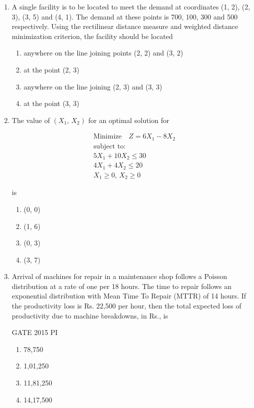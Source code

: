 \documentclass[journal,12pt,onecolumn]{IEEEtran}
\theoremstyle{remark}
\begin{document}
\begin{enumerate}
\item A single facility is to be located to meet the demand at coordinates (1, 2), (2, 3), (3, 5) and (4, 1). The demand at these points is 700, 100, 300 and 500 respectively. Using the rectilinear distance measure and weighted distance minimization criterion, the facility should be located
\begin{multicols}{2}
\begin{enumerate}
    \item anywhere on the line joining points (2, 2) and (3, 2)
    \item at the point (2, 3)
    \item anywhere on the line joining (2, 3) and (3, 3)
    \item at the point (3, 3)
\end{enumerate}
\end{multicols}

\item The value of $(X_1,\,X_2)$ for an optimal solution for

\[
\begin{aligned}
& \text{Minimize} \quad Z = 6X_1 - 8X_2 \\
& \text{subject to:} \\
& 5X_1 + 10X_2 \leq 30 \\
& 4X_1 + 4X_2 \leq 20 \\
& X_1 \geq 0,\, X_2 \geq 0
\end{aligned}
\]

is

\begin{multicols}{2}
\begin{enumerate}
    \item (0, 0)
    \item (1, 6)
    \item (0, 3)
    \item (3, 7)
\end{enumerate}
\end{multicols}

\item Arrival of machines for repair in a maintenance shop follows a Poisson distribution at a rate of one per 18 hours. The time to repair follows an exponential distribution with Mean Time To Repair (MTTR) of 14 hours. If the productivity loss is Rs. 22,500 per hour, then the total expected loss of productivity due to machine breakdowns, in Rs., is

\hfill{GATE 2015 PI}
\begin{multicols}{2}
\begin{enumerate}
    \item 78,750
    \item 1,01,250
    \item 11,81,250
    \item 14,17,500
\end{enumerate}
\end{multicols}


\end{enumerate}
\end{document}
